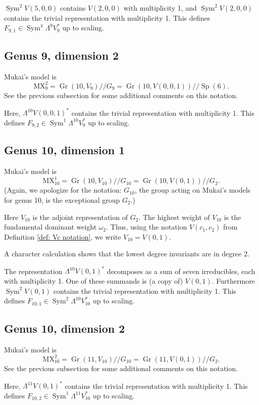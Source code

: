 \documentclass{amsart}[12pt]
\theoremstyle{definition}
\numberwithin{equation}{section}
\newcommand{\Sym}{\operatorname{Sym}}
\newcommand{\Sp}{\operatorname{Sp}}
\newcommand{\Gr}{\operatorname{Gr}}
\newcommand{\git}{/\!\!/}
\newcommand{\mywedge}{\mathsf{\Lambda}}
\newcommand{\mukai}{\mathrm{MX}}
\newcommand{\LieG}{G}
\begin{document}
$\Sym^2 V(5,0,0)$ contains $V(2,0,0)$ with
multiplicity 1, and $\Sym^2 V(2,0,0)$ contains the trivial
representation with multiplicity 1. This defines $F_{9,1} \in
\Sym^4 \mywedge^9 V_9^{*}$ up to scaling.

\subsection{Genus 9, dimension 2}
Mukai's model is
\[
\mukai^{2}_9 =  \Gr(10,V_9) \git \LieG_9 = \Gr(10,V(0,0,1)) \git \Sp(6).
\]
See the previous subsection for some additional comments on this
notation.

Here, $\mywedge^{10} V(0,0,1)^{*}$ contains the trivial representation with multiplicity 1. This defines $F_{9,2} \in
\Sym^1 \mywedge^{10} V_9^{*}$ up to scaling.


\subsection{Genus 10, dimension 1}
Mukai's model is
\[
\mukai^{1}_{10} =  \Gr(10,V_{10}) \git \LieG_{10} = \Gr(10,V(0,1)) \git G_2.
\]
(Again, we apologize for the notation: $\LieG_{10}$, the group acting on Mukai's models for genus 10, is the exceptional group $G_2$.)

Here $V_{10}$ is the adjoint representation of $G_2$. The highest
weight of $V_{10}$ is the fundamental dominant weight
$\omega_2$. Thus, using the notation $V(c_1,c_2)$ from
Definition \ref{def: Vc notation}, we write $V_{10} = V(0,1)$.  

A character calculation shows that the lowest degree invariants are in
degree 2.

The representation $\mywedge^{10} V(0,1)^{*} $ decomposes as a sum of
seven irreducibles, each with multiplicity 1. One of these summands is
(a copy of) $V(0,1)$. Furthermore
$\Sym^2 V(0,1)$ contains the trivial representation with multiplicity 1. This defines $F_{10,1} \in
\Sym^2 \mywedge^{10} V_{10}^{*}$ up to scaling.

\subsection{Genus 10, dimension 2}
Mukai's model is
\[
\mukai^{2}_{10} =  \Gr(11,V_{10}) \git \LieG_{10} = \Gr(11,V(0,1)) \git G_2.
\]
See the previous subsection for some additional comments on this
notation.

Here, $\mywedge^{11} V(0,1)^{*}$ contains the trivial representation with multiplicity 1. This defines $F_{10,2} \in
\Sym^1 \mywedge^{11} V_{10}^{*}$ up to scaling.
 
\end{document}
